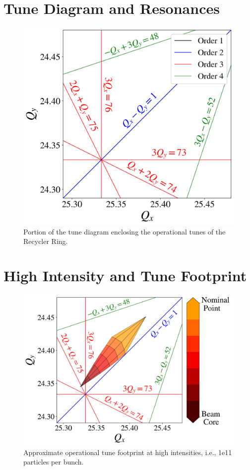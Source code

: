 \section{Tune Diagram and Resonances}

\begin{figure}[H]
   \centering
   \includegraphics[width=\columnwidth]{chapter3/rrtd.png}
   \caption{Portion of the tune diagram enclosing the operational tunes of the Recycler Ring.}
   \label{fig:rrtd}
\end{figure}

\section{High Intensity and Tune Footprint}

\begin{figure}[H]
   \centering
   \includegraphics[width=\columnwidth]{chapter3/rrtdhigh.png}
   \caption{Approximate operational tune footprint at high intensities, i.e., 1e11 particles per bunch.}
   \label{fig:rrtdhigh}
\end{figure}

